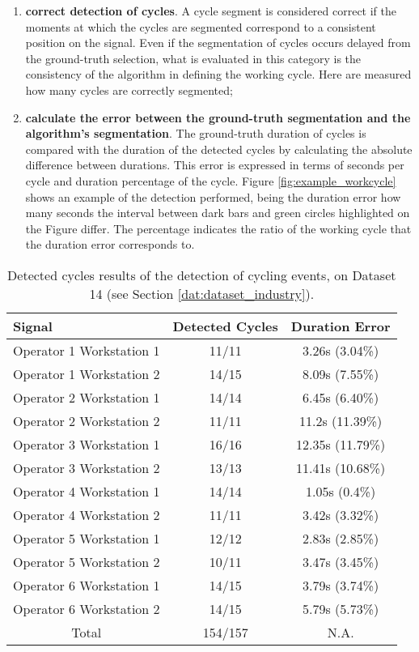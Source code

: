 \begin{enumerate}

\item \textbf{correct detection of cycles}. A cycle segment is considered correct if the moments at which the cycles are segmented correspond to a consistent position on the signal. Even if the segmentation of cycles occurs delayed from the ground-truth selection, what is evaluated in this category is the consistency of the algorithm in defining the working cycle. Here are measured how many cycles are correctly segmented;

\item \textbf{calculate the error between the ground-truth segmentation and the algorithm's segmentation}. The ground-truth duration of cycles is compared with the duration of the detected cycles by calculating the absolute difference between durations. This error is expressed in terms of seconds per cycle and duration percentage of the cycle. Figure \ref{fig:example_workcycle} shows an example of the detection performed, being the duration error how many seconds the interval between dark bars and green circles highlighted on the Figure differ. The percentage indicates the ratio of the working cycle that the duration error corresponds to. 

\end{enumerate}

\begin{table}
\centering
\caption{Detected cycles results of the detection of cycling events, on Dataset 14 (see Section \ref{dat:dataset_industry}).}
\label{tab:wc_results}
\begin{tabular}{lcc} 
\toprule
Signal & Detected Cycles & Duration Error\\ 
\midrule
Operator 1 Workstation 1 & 11/11 & 3.26s (3.04\%)\\
Operator 1 Workstation 2 & 14/15 & 8.09s (7.55\%)\\
Operator 2 Workstation 1 & 14/14 & 6.45s (6.40\%)\\
Operator 2 Workstation 2 & 11/11 & 11.2s (11.39\%)\\
Operator 3 Workstation 1 & 16/16 & 12.35s (11.79\%)\\
Operator 3 Workstation 2 & 13/13 & 11.41s (10.68\%)\\
Operator 4 Workstation 1 & 14/14 & 1.05s (0.4\%)\\
Operator 4 Workstation 2 & 11/11 & 3.42s (3.32\%)\\
Operator 5 Workstation 1 & 12/12 & 2.83s (2.85\%)\\
Operator 5 Workstation 2 & 10/11 & 3.47s (3.45\%)\\
Operator 6 Workstation 1 & 14/15 & 3.79s (3.74\%)\\
Operator 6 Workstation 2 & 14/15 & 5.79s (5.73\%)\\
\midrule
\multicolumn{1}{c}{Total} & 154/157 & N.A.\\
\bottomrule
\end{tabular}
\end{table}

